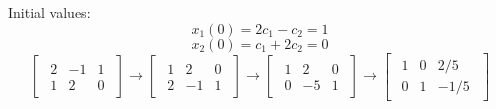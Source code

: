 {    Initial values: \\
    \[
        x_1(0) = 2c_1 - c_2 = 1
    \]
    \[
        x_2(0) = c_1 + 2c_2 = 0
    \]
    \[
        \begin{bmatrix}
            \begin{array}{cc|c}
                2 & -1 & 1 \\
                1 & 2 & 0
            \end{array}
        \end{bmatrix}
        \to
        \begin{bmatrix}
            \begin{array}{cc|c}
                1 & 2 & 0 \\
                2 & -1 & 1
            \end{array}
        \end{bmatrix}
        \to
        \begin{bmatrix}
            \begin{array}{cc|c}
                1 & 2 & 0 \\
                0 & -5 & 1
            \end{array}
        \end{bmatrix}
        \to
        \begin{bmatrix}
            \begin{array}{cc|c}
                1 & 0 & 2/5 \\
                0 & 1 & -1/5
            \end{array}
        \end{bmatrix}
    \]

}

